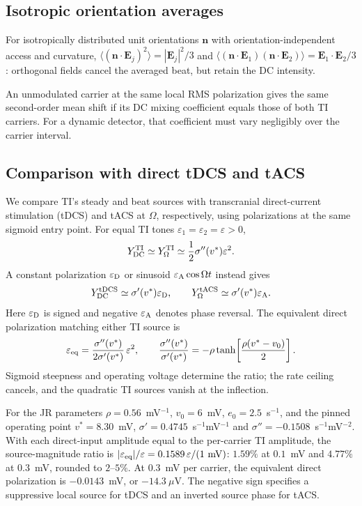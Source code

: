 \documentclass[11pt,a4paper]{article}
\newcommand{\Sig}{\sigma}
\begin{document}
\subsection{Isotropic orientation averages}\label{supp:orientation}
For isotropically distributed unit orientations
$\mathbf n$ with orientation-independent access and curvature,
$\langle(\mathbf n\cdot\mathbf E_j)^2\rangle=|\mathbf E_j|^2/3$
and $\langle(\mathbf n\cdot\mathbf E_1)(\mathbf n\cdot\mathbf E_2)\rangle
=\mathbf E_1\cdot\mathbf E_2/3$: orthogonal fields cancel the averaged beat,
but retain the DC intensity.

\fi
An unmodulated carrier at the same local RMS polarization gives the same
second-order mean shift if its DC mixing coefficient equals those of both
TI carriers. For a dynamic detector, that coefficient must vary negligibly
over the carrier interval.

\subsection{Comparison with direct tDCS and tACS}\label{sec:direct-comparison}
We compare TI's steady and beat sources with transcranial direct-current
stimulation (tDCS) and tACS at $\Omega$, respectively, using polarizations
at the same sigmoid entry point. For equal TI tones
$\varepsilon_1=\varepsilon_2=\varepsilon>0$,
\[
Y_{\rm DC}^{\rm TI}\simeq Y_\Omega^{\rm TI}
\simeq \frac{1}{2}\Sig''(v^*)\varepsilon^2.
\]
A constant polarization $\varepsilon_{\rm D}$ or sinusoid
$\varepsilon_{\rm A}\cos\Omega t$ instead gives
\[
Y_{\rm DC}^{\rm tDCS}\simeq\Sig'(v^*)\varepsilon_{\rm D},
\qquad
Y_\Omega^{\rm tACS}\simeq\Sig'(v^*)\varepsilon_{\rm A}.
\]
Here $\varepsilon_{\rm D}$ is signed and negative $\varepsilon_{\rm A}$
denotes phase reversal. The equivalent direct polarization matching either
TI source is
\[
\varepsilon_{\rm eq}
=\frac{\Sig''(v^*)}{2\Sig'(v^*)}\,\varepsilon^2,
\qquad
\frac{\Sig''(v^*)}{\Sig'(v^*)}
=-\rho\tanh\!\left[\frac{\rho(v^*-v_0)}{2}\right].
\]
Sigmoid steepness and operating voltage determine the ratio; the rate ceiling
cancels, and the quadratic TI sources vanish at the inflection.

For the JR parameters $\rho=0.56$~mV$^{-1}$, $v_0=6$~mV,
$e_0=2.5$~s$^{-1}$, and the pinned operating point $v^*=8.30$~mV,
$\Sig'=0.4745$~s$^{-1}$mV$^{-1}$ and
$\Sig''=-0.1508$~s$^{-1}$mV$^{-2}$. With each direct-input amplitude
equal to the per-carrier TI amplitude, the source-magnitude ratio is
$|\varepsilon_{\rm eq}|/\varepsilon
=0.1589\,\varepsilon/(1~\mathrm{mV})$:
$1.59\%$ at $0.1$~mV and $4.77\%$ at $0.3$~mV, rounded to $2$--$5\%$.
At $0.3$~mV per carrier, the equivalent direct polarization is
$-0.0143$~mV, or $-14.3~\mu$V. The negative sign specifies a suppressive
local source for tDCS and an inverted source phase for tACS.
\end{document}
